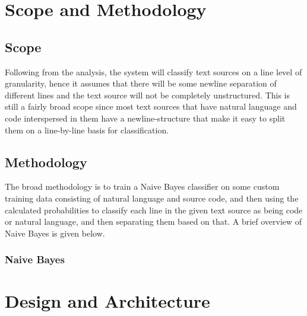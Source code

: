 \documentclass[12pt]{scrreprt}
\begin{document}
\chapter{Scope and Methodology}

\section{Scope}
Following from the analysis, the system will classify text sources on a line level of granularity, hence it assumes that there will be some newline separation of different lines and the text source will not be completely unstructured. This is still a fairly broad scope since most text sources that have natural language and code interspersed in them have a newline-structure that make it easy to split them on a line-by-line basis for classification. 


\section{Methodology}

The broad methodology is to train a Naive Bayes classifier on some custom training data consisting of natural language and source code, and then using the calculated probabilities to classify each line in the given text source as being code or natural language, and then separating them based on that. A brief overview of Naive Bayes is given below.
\subsection{Naive Bayes}







\chapter{Design and Architecture}




\end{document}
